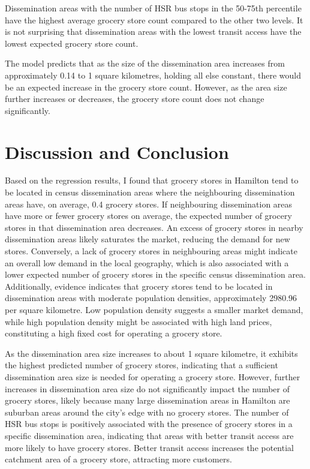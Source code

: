 \documentclass[preprint, 3p,
authoryear]{elsarticle} %
\begin{document}
Dissemination areas with the number of HSR bus stops in the 50-75th
percentile have the highest average grocery store count compared to the
other two levels. It is not surprising that dissemination areas with the
lowest transit access have the lowest expected grocery store count.

The model predicts that as the size of the dissemination area increases
from approximately 0.14 to 1 square kilometres, holding all else
constant, there would be an expected increase in the grocery store
count. However, as the area size further increases or decreases, the
grocery store count does not change significantly.

\section{Discussion and Conclusion}\label{discussion-and-conclusion}

Based on the regression results, I found that grocery stores in Hamilton
tend to be located in census dissemination areas where the neighbouring
dissemination areas have, on average, 0.4 grocery stores. If
neighbouring dissemination areas have more or fewer grocery stores on
average, the expected number of grocery stores in that dissemination
area decreases. An excess of grocery stores in nearby dissemination
areas likely saturates the market, reducing the demand for new stores.
Conversely, a lack of grocery stores in neighbouring areas might
indicate an overall low demand in the local geography, which is also
associated with a lower expected number of grocery stores in the
specific census dissemination area. Additionally, evidence indicates
that grocery stores tend to be located in dissemination areas with
moderate population densities, approximately 2980.96 per square
kilometre. Low population density suggests a smaller market demand,
while high population density might be associated with high land prices,
constituting a high fixed cost for operating a grocery store.

As the dissemination area size increases to about 1 square kilometre, it
exhibits the highest predicted number of grocery stores, indicating that
a sufficient dissemination area size is needed for operating a grocery
store. However, further increases in dissemination area size do not
significantly impact the number of grocery stores, likely because many
large dissemination areas in Hamilton are suburban areas around the
city's edge with no grocery stores. The number of HSR bus stops is
positively associated with the presence of grocery stores in a specific
dissemination area, indicating that areas with better transit access are
more likely to have grocery stores. Better transit access increases the
potential catchment area of a grocery store, attracting more customers.
\end{document}
